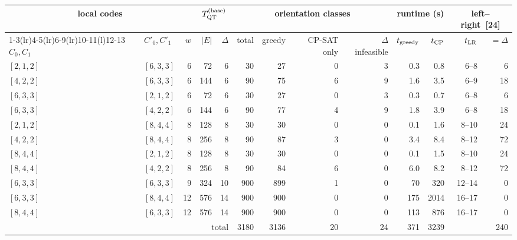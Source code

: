 \begin{table}
\centering
\begin{tabular}{@{}llr rr rrrr rr rr@{}}
\toprule
\multicolumn{3}{c}{local codes} & \multicolumn{2}{c}{$T^{(\rm base)}_{\rm QT}$}
 & \multicolumn{4}{c}{orientation classes} & \multicolumn{2}{c}{runtime (s)}
 & \multicolumn{2}{c}{left--right~[24]} \\
\cmidrule(r){1-3}\cmidrule(lr){4-5}\cmidrule(lr){6-9}\cmidrule(lr){10-11}\cmidrule(l){12-13}
$C_0,C_1$ & $C'_0,C'_1$ & $w$ & $|E|$ & $\Delta$
 & total & greedy & CP-SAT only & $\Delta$ infeasible
 & $t_{\rm greedy}$ & $t_{\rm CP}$
 & $t_{\rm LR}$ & $=\Delta$ \\
\midrule
$[2,1,2]$ & $[6,3,3]$ &  6 &  72 &  6 &  30 &  27 & 0 & 3 &   0.3 &    0.8 & 6--8   &  6 \\
$[4,2,2]$ & $[6,3,3]$ &  6 & 144 &  6 &  90 &  75 & 6 & 9 &   1.6 &    3.5 & 6--9   & 18 \\
$[6,3,3]$ & $[2,1,2]$ &  6 &  72 &  6 &  30 &  27 & 0 & 3 &   0.3 &    0.7 & 6--8   &  6 \\
$[6,3,3]$ & $[4,2,2]$ &  6 & 144 &  6 &  90 &  77 & 4 & 9 &   1.8 &    3.9 & 6--8   & 18 \\
\addlinespace[2pt]
$[2,1,2]$ & $[8,4,4]$ &  8 & 128 &  8 &  30 &  30 & 0 & 0 &   0.1 &    1.6 & 8--10  & 24 \\
$[4,2,2]$ & $[8,4,4]$ &  8 & 256 &  8 &  90 &  87 & 3 & 0 &   3.4 &    8.4 & 8--12  & 72 \\
$[8,4,4]$ & $[2,1,2]$ &  8 & 128 &  8 &  30 &  30 & 0 & 0 &   0.1 &    1.5 & 8--10  & 24 \\
$[8,4,4]$ & $[4,2,2]$ &  8 & 256 &  8 &  90 &  84 & 6 & 0 &   6.0 &    8.2 & 8--12  & 72 \\
\addlinespace[2pt]
$[6,3,3]$ & $[6,3,3]$ &  9 & 324 & 10 & 900 & 899 & 1 & 0 &  70\phantom{.0} &  320\phantom{.0} & 12--14 &  0 \\
\addlinespace[2pt]
$[6,3,3]$ & $[8,4,4]$ & 12 & 576 & 14 & 900 & 900 & 0 & 0 & 175\phantom{.0} & 2014\phantom{.0} & 16--17 &  0 \\
$[8,4,4]$ & $[6,3,3]$ & 12 & 576 & 14 & 900 & 900 & 0 & 0 & 113\phantom{.0} &  876\phantom{.0} & 16--17 &  0 \\
\midrule
\multicolumn{5}{r}{total} & 3180 & 3136 & 20 & 24 & 371\phantom{.0} & 3239\phantom{.0} & & 240 \\

\end{tabular}
\end{table}
